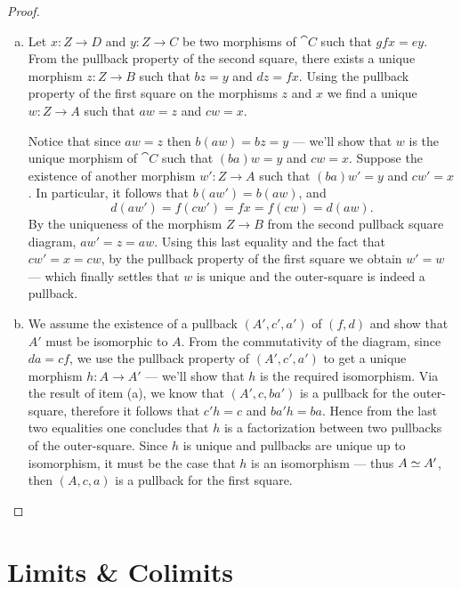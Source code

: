 \begin{proof}
\begin{enumerate}[(a)]\setlength\itemsep{0em}
\item Let \(x: Z \to D\) and \(y: Z \to C\) be two morphisms of \(\cat C\) such
  that \(g f x = e y\). From the pullback property of the second square, there
  exists a unique morphism \(z: Z \to B\) such that \(b z = y\) and
  \(d z = f x\). Using the pullback property of the first square on the
  morphisms \(z\) and \(x\) we find a unique \(w: Z \to A\) such that
  \(a w = z\) and \(c w = x\).

  Notice that since \(a w = z\) then \(b (a w) = b z = y\) --- we'll show that
  \(w\) is the unique morphism of \(\cat C\) such that \((b a) w = y\) and
  \(c w = x\). Suppose the existence of another morphism \(w': Z \to A\) such
  that \((b a) w' = y\) and \(c w' = x\). In particular, it follows that \(b (a
  w') = b (a w)\), and
  \[
  d (a w') = f (c w') = f x = f (c w) = d (a w).
  \]
  By the uniqueness of the morphism \(Z \to B\) from the second pullback square
  diagram, \(a w' = z = a w\). Using this last equality and the fact that
  \(c w' = x = c w\), by the pullback property of the first square we obtain
  \(w' = w\) --- which finally settles that \(w\) is unique and the outer-square
  is indeed a pullback.

\item We assume the existence of a pullback \((A', c', a')\) of \((f, d)\) and
  show that \(A'\) must be isomorphic to \(A\). From the commutativity of the
  diagram, since \(d a = c f\), we use the pullback property of \((A', c', a')\)
  to get a unique morphism \(h: A \to A'\) --- we'll show that \(h\) is the
  required isomorphism. Via the result of item (a), we know that
  \((A', c, b a')\) is a pullback for the outer-square, therefore it follows
  that \(c' h = c\) and \(b a' h = b a\). Hence from the last two equalities one
  concludes that \(h\) is a factorization between two pullbacks of the
  outer-square. Since \(h\) is unique and pullbacks are unique up to
  isomorphism, it must be the case that \(h\) is an isomorphism --- thus
  \(A \simeq A'\), then \((A, c, a)\) is a pullback for the first square.
\end{enumerate}
\end{proof}

\section{Limits \& Colimits}


